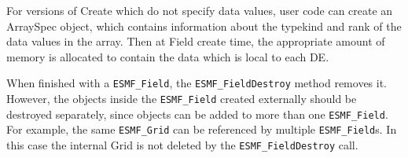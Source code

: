 For versions of Create which do not specify data values,
user code can create an ArraySpec object, which
contains information about the typekind and rank of the
data values in the array.  Then at Field create time, the
appropriate amount of memory is allocated to contain the
data which is local to each DE.

When finished with a {\tt ESMF\_Field}, the {\tt ESMF\_FieldDestroy} method
removes it.  However, the objects inside the {\tt ESMF\_Field}
created externally should be destroyed separately, 
since objects can be added to
more than one {\tt ESMF\_Field}.  For example, the same {\tt ESMF\_Grid}
can be referenced by multiple {\tt ESMF\_Field}s.  In this case the
internal Grid is not deleted by the {\tt ESMF\_FieldDestroy} call.
